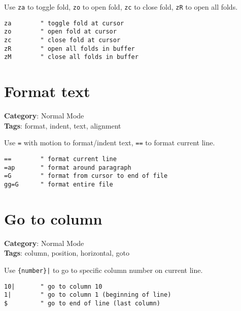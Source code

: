 {{{{{{{{{{Use {\footnotesize \Verb§za§} to toggle fold, {\footnotesize \Verb§zo§} to open fold, {\footnotesize \Verb§zc§} to close fold, {\footnotesize \Verb§zR§} to open all folds.

\begin{Exa*}{}
\begin{Verbatim}[fontsize=\footnotesize, breaklines, breakanywhere]
za        " toggle fold at cursor
zo        " open fold at cursor
zc        " close fold at cursor
zR        " open all folds in buffer
zM        " close all folds in buffer
\end{Verbatim}
\end{Exa*}

\section{Format text}

\textbf{Category}: Normal Mode\\ \textbf{Tags}: format, indent, text, alignment
\vspace{0.5cm}

Use {\footnotesize \Verb§=§} with motion to format/indent text, {\footnotesize \Verb§==§} to format current line.

\begin{Exa*}{}
\begin{Verbatim}[fontsize=\footnotesize, breaklines, breakanywhere]
==        " format current line
=ap       " format around paragraph
=G        " format from cursor to end of file
gg=G      " format entire file
\end{Verbatim}
\end{Exa*}

\section{Go to column}

\textbf{Category}: Normal Mode\\ \textbf{Tags}: column, position, horizontal, goto
\vspace{0.5cm}

Use {\footnotesize \Verb§{number}|§} to go to specific column number on current line.

\begin{Exa*}{}
\begin{Verbatim}[fontsize=\footnotesize, breaklines, breakanywhere]
10|       " go to column 10
1|        " go to column 1 (beginning of line)
$         " go to end of line (last column)
\end{Verbatim}
\end{Exa*}

}}}}}}}}}}
